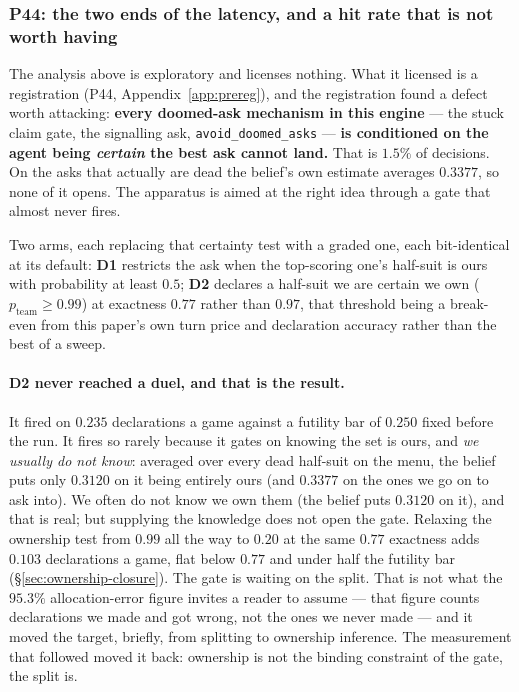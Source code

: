 \documentclass[11pt,letterpaper]{article}
\begin{document}
\subsubsection{P44: the two ends of the latency, and a hit rate that is not
worth having}

The analysis above is exploratory and licenses nothing. What it licensed is a
registration (P44, Appendix~\ref{app:prereg}), and the registration found a
defect worth attacking: \textbf{every doomed-ask mechanism in this engine} ---
the stuck claim gate, the signalling ask, \texttt{avoid\_doomed\_asks} ---
\textbf{is conditioned on the agent being \emph{certain} the best ask cannot
land.} That is $1.5\%$ of decisions. On the asks that actually are dead the
belief's own estimate averages $0.3377$, so none of it opens. The apparatus is
aimed at the right idea through a gate that almost never fires.

Two arms, each replacing that certainty test with a graded one, each
bit-identical at its default: \textbf{D1} restricts the ask when the
top-scoring one's half-suit is ours with probability at least $0.5$;
\textbf{D2} declares a half-suit we are certain we own ($p_{\text{team}} \ge
0.99$) at exactness $0.77$ rather than $0.97$, that threshold being a
break-even from this paper's own turn price and declaration accuracy rather
than the best of a sweep.

\paragraph{D2 never reached a duel, and that is the result.} It fired on
$0.235$ declarations a game against a futility bar of $0.250$ fixed before the
run. It fires so rarely because it gates on knowing the set is ours, and
\emph{we usually do not know}: averaged over every dead half-suit on the menu,
the belief puts only $0.3120$ on it being entirely ours (and $0.3377$ on the
ones we go on to ask into). We often do not know we own them (the belief puts $0.3120$ on it), and that
is real; but supplying the knowledge does not open the gate. Relaxing the
ownership test from $0.99$ all the way to $0.20$ at the same $0.77$ exactness
adds $0.103$ declarations a game, flat below $0.77$ and under half the
futility bar (\S\ref{sec:ownership-closure}). The gate is waiting on the
split. That is not what the $95.3\%$ allocation-error figure invites a reader
to assume --- that figure counts declarations we made and got wrong, not the
ones we never made --- and it moved the target, briefly, from splitting to
ownership inference. The measurement that followed moved it back: ownership
is not the binding constraint of the gate, the split is.
\end{document}

